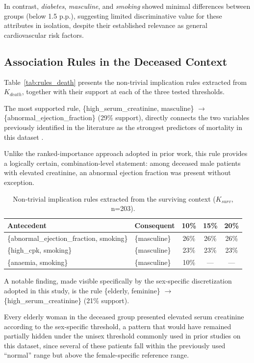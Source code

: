 \documentclass[a4paper,twoside]{article}
\begin{document}
In contrast, \textit{diabetes}, \textit{masculine}, and \textit{smoking} showed minimal differences between groups (below 1.5 p.p.), suggesting limited discriminative value for these attributes in isolation, despite their established relevance as general cardiovascular risk factors.

\subsection{Association Rules in the Deceased Context}

Table~\ref{tab:rules_death} presents the non-trivial implication rules extracted from $K_{death}$, together with their support at each of the three tested thresholds.


The most supported rule, \{high\_serum\_creatinine, masculine\} $\rightarrow$ \{abnormal\_ejection\_fraction\} (29\% support), directly connects the two variables previously identified in the literature as the strongest predictors of mortality in this dataset \cite{Ahmad2017,ChiccoJurman2020}. 

Unlike the ranked-importance approach adopted in prior work, this rule provides a logically certain, combination-level statement: among deceased male patients with elevated creatinine, an abnormal ejection fraction was present without exception.


\begin{table}[hbt]
\caption{Non-trivial implication rules extracted from the surviving context ($K_{surv}$, n=203).}\label{tab:rules_surv}
\centering
{
\begin{tabular}{|p{6.5cm}|p{3.8cm}|c|c|c|}
  \hline
  \textbf{Antecedent} & \textbf{Consequent} & \textbf{10\%} & \textbf{15\%} & \textbf{20\%} \\
  \hline
  \{abnormal\_ejection\_fraction, smoking\} & \{masculine\} & 26\% & 26\% & 26\% \\
  \{high\_cpk, smoking\} & \{masculine\} & 23\% & 23\% & 23\% \\
  \{anaemia, smoking\} & \{masculine\} & 10\% & --- & --- \\
  \hline
\end{tabular}}
\end{table}

A notable finding, made visible specifically by the sex-specific discretization adopted in this study, is the rule \{elderly, feminine\} $\rightarrow$ \{high\_serum\_creatinine\} (21\% support). 

Every elderly woman in the deceased group presented elevated serum creatinine according to the sex-specific threshold, a pattern that would have remained partially hidden under the unisex threshold commonly used in prior studies on this dataset, since several of these patients fall within the previously used ``normal'' range but above the female-specific reference range.
\end{document}
